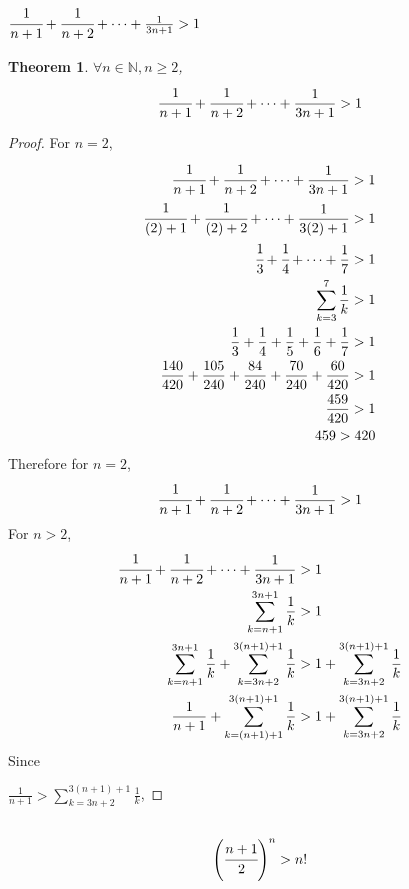 \documentclass[]{article}
\newcommand{\N}{\mathbb{N}}
\newtheorem{theorem}{Theorem}
\begin{document}
\subsection{
    $\cfrac{1}{n+1} + \cfrac{1}{n+2} + \cdots + \frac{1}{3n+1} > 1$
}
\begin{theorem}$\forall n \in \N, n \geq 2$,
    $$\cfrac{1}{n+1} + \cfrac{1}{n+2} + \cdots + \frac{1}{3n+1} > 1$$
\end{theorem}
\begin{proof}
    For $n = 2$,
    \begin{align*}
        \cfrac{1}{n+1} + \cfrac{1}{n+2} + \cdots + \frac{1}{3n+1} > 1\\
        \cfrac{1}{(2)+1} + \cfrac{1}{(2)+2} + \cdots + \frac{1}{3(2)+1} > 1\\
        \cfrac{1}{3} + \cfrac{1}{4} + \cdots + \frac{1}{7} > 1\\
        \sum_{k=3}^{7} \frac{1}{k} > 1\\
        \frac{1}{3} + \frac{1}{4} + \frac{1}{5} + \frac{1}{6} + \frac{1}{7} > 1\\
        \frac{140}{420} + \frac{105}{240} + \frac{84}{240} + \frac{70}{240} + 
            \frac{60}{420} > 1\\
        \frac{459}{420} > 1\\
        459 > 420
    \end{align*}
    Therefore for $n = 2$,
    $$\cfrac{1}{n+1} + \cfrac{1}{n+2} + \cdots + \frac{1}{3n+1} > 1$$
    For $n > 2$,
    \begin{align*}
        \cfrac{1}{n+1} + \cfrac{1}{n+2} + \cdots + \frac{1}{3n+1} &> 1\\
        \sum_{k=n+1}^{3n+1} \frac{1}{k} &> 1\\
        \sum_{k=n+1}^{3n+1} \frac{1}{k} + \sum_{k=3n+2}^{3(n+1) + 1} \frac{1}{k} 
            &> 1 + \sum_{k=3n+2}^{3(n+1) + 1} \frac{1}{k}\\
        \frac{1}{n+1} + \sum_{k=(n+1) + 1}^{3(n+1)+1} \frac{1}{k}
            &> 1 + \sum_{k = 3n+2}^{3(n+1) + 1} \frac{1}{k}\\
    \end{align*}
    Since 

    $\frac{1}{n+1} > \sum_{k = 3n+2}^{3(n+1) + 1} \frac{1}{k}$,
    

\end{proof}



\subsection{
    $$\qty(\cfrac{n+1}{2})^n > n!$$
}
\end{document}
